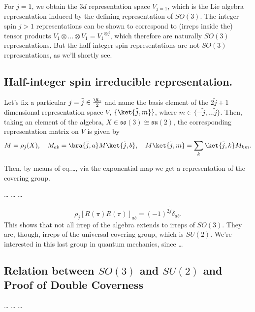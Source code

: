 For $j=1$, we obtain the $3d$ representation space $V_{j=1}$, which is the Lie algebra representation induced by the defining representation of $SO(3)$. The integer spin $j>1$ representations can be shown to correspond to (irreps inside the) tensor
products $V_1 \otimes \dots \otimes V_1 = {V_1}^{\otimes j}$, which therefore are naturally $SO(3)$ representations. But the half-integer spin representations are not $SO(3)$ representations, as we'll shortly see.


\subsection{Half-integer spin irreducible representation.}
Let's fix a particular $j = \tilde{j} \in \frac{\N_0}{2}$ and name the basis element of the $2 \tilde{j} + 1$ dimensional representation space $V$, $\{ \ket{\tilde{j}, m} \}$, where $m \in \{ -\tilde{j}, \dots \tilde{j} \}$. Then, taking an element of the algebra, $X \in \mathfrak{so}(3) \cong \mathfrak{su}(2)$, the corresponding representation matrix on $V$ is given by
\begin{equation}
    M = \rho_j (X), \quad M_{ab} = \bra{\tilde{j},a} M \ket{\tilde{j},b}, \quad M \ket{\tilde{j}, m} = \sum_k \ket{\tilde{j}, k} M_{km} .
\end{equation}

Then, by means of eq.\dots, via the exponential map we get a representation of the covering group.

\color{red}
\dots
\dots
\dots

\begin{equation}
    \rho_j[R(\pi)R(\pi)]_{ab} = (-1)^{2\tilde{j}} \delta_{ab}.
\end{equation}
This shows that not all irrep of the algebra extends to irreps of $SO(3)$. They are, though, irreps of the universal covering group, which is $SU(2)$. We're interested in this last group in quantum mechanics, since \dots
\color{black}

\subsection{Relation between \texorpdfstring{$SO(3)$}{SO(3)} and \texorpdfstring{$SU(2)$}{SU(2)} and Proof of Double Coverness}
\dots
\dots
\dots
\color{black} 